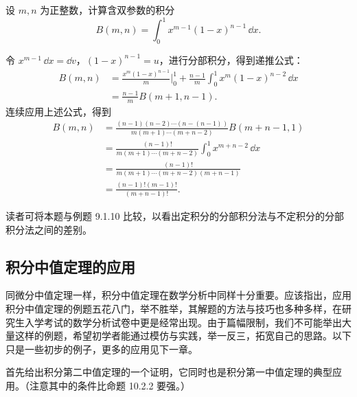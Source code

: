 \begin{xexample}[10.4.10]
设 $m,n$ 为正整数，计算含双参数的积分
\[
  B(m,n)=\int_0^1x^{m-1}(1-x)^{n-1}\,\dd x.
\]
\end{xexample}
\begin{xsolution}
令 $x^{m-1}\,\dd x=\dd v$，$(1-x)^{n-1}=u$，进行分部积分，得到递推公式：
\begin{align*}
  B(m,n)
  &=\frac{x^m(1-x)^{n-1}}m\Big|_0^1
    +\frac{n-1}{m}\int_0^1x^m(1-x)^{n-2}\,\dd x\\
  &=\frac{n-1}{m}B(m+1,n-1).
\end{align*}
连续应用上述公式，得到
\begin{align*}
  B(m,n)
  &=\frac{(n-1)(n-2)\cdots(n-(n-1))}{m(m+1)\cdots(m+n-2)}B(m+n-1,1)\\
  &=\frac{(n-1)!}{m(m+1)\cdots(m+n-2)}\int_0^1x^{m+n-2}\,\dd x\\
  &=\frac{(n-1)!}{m(m+1)\cdots(m+n-2)(m+n-1)}\\
  &=\frac{(n-1)!(m-1)!}{(m+n-1)!}.
\end{align*}
\end{xsolution}

\begin{xremark}
读者可将本题与例题 9.1.10 比较，以看出定积分的分部积分法与不定积分的分部积分法之间的差别。
\end{xremark}

\subsection{积分中值定理的应用}

同微分中值定理一样，积分中值定理在数学分析中同样十分重要。应该指出，应用积分中值定理的例题五花八门，举不胜举，其解题的方法与技巧也多种多样，在研究生入学考试的数学分析试卷中更是经常出现。由于篇幅限制，我们不可能举出大量这样的例题，希望初学者能通过模仿与实践，举一反三，拓宽自己的思路。以下只是一些初步的例子，更多的应用见下一章。

首先给出积分第二中值定理的一个证明，它同时也是积分第一中值定理的典型应用。（注意其中的条件比命题 10.2.2 要强。）

